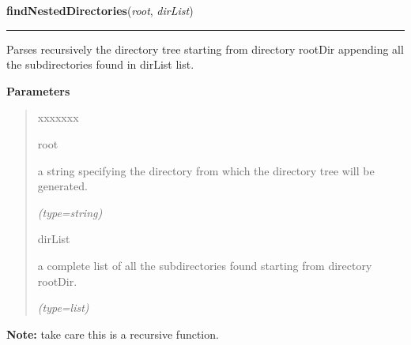 \hspace{.8\funcindent}\begin{boxedminipage}{\funcwidth}

    \raggedright \textbf{findNestedDirectories}(\textit{root}, \textit{dirList})

    \vspace{-1.5ex}

    \rule{\textwidth}{0.5\fboxrule}
\setlength{\parskip}{2ex}
    Parses recursively the directory tree starting from directory 
    {\textbar}rootDir{\textbar} appending all the subdirectories found in 
    {\textbar}dirList{\textbar} list.

\setlength{\parskip}{1ex}
      \textbf{Parameters}
      \vspace{-1ex}

      \begin{quote}
        \begin{Ventry}{xxxxxxx}

          \item[root]

          a string specifying the directory from which the directory tree 
          will be generated.

            {\it (type=string)}

          \item[dirList]

          a complete list of all the subdirectories found starting from 
          directory {\textbar}rootDir{\textbar}.

            {\it (type=list)}

        \end{Ventry}

      \end{quote}

\textbf{Note:} take care this is a recursive function.



    \end{boxedminipage}

    \label{nMOLDYN:Core:Misc:findExecutable}

    \vspace{0.5ex}

